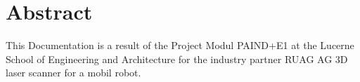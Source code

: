\chapter*{Abstract}
This Documentation is a result of the Project Modul PAIND+E1 at the Lucerne School of Engineering and Architecture for the industry partner RUAG AG     \glqq3D laser scanner for a mobil robot\glqq. 